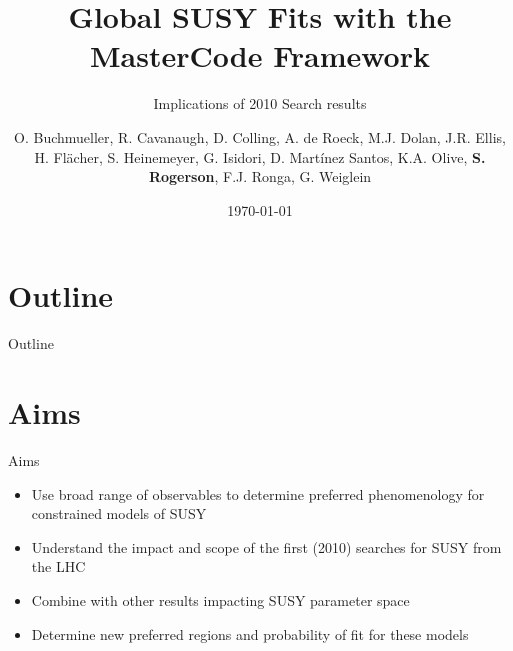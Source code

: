 \documentclass{beamer}
\begin{document}
\title{Global SUSY Fits with the MasterCode Framework}
\subtitle{Implications of 2010 Search results}
\author[S. Rogerson]{\tiny O. Buchmueller, R. Cavanaugh, D. Colling, A. de Roeck, M.J. Dolan, J.R.
Ellis, H. Fl\"{a}cher, S. Heinemeyer, G. Isidori, D. Mart\'{i}nez Santos, K.A.
Olive, \textbf{S. Rogerson}, F.J. Ronga, G. Weiglein}
\date{\today}

\begin{frame}[plain]
    \titlepage
\end{frame}

\section*{Outline}
\begin{frame}{Outline}
    \tableofcontents
\end{frame}


\section{Aims}
\begin{frame}{Aims}
  \begin{itemize}
    \item Use broad range of observables to determine preferred phenomenology for constrained
    models of SUSY
    \item Understand the impact and scope of the first (2010) searches for SUSY from the LHC
    \item Combine with other results impacting SUSY parameter space
    \item Determine new preferred regions and probability of fit for these models
  \end{itemize} 
\end{frame}
\end{document}
